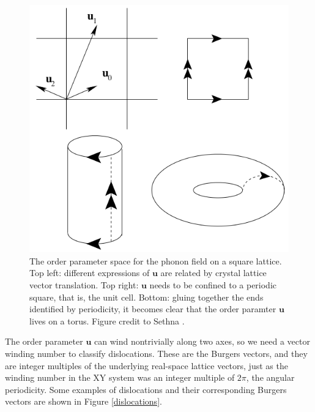 \documentclass[a4paper,10pt]{article}
\newcommand{\bv}[1]{\mathbf{#1}}
\begin{document}
\begin{figure}
 \centering
 \includegraphics[scale=0.3]{OPspacecrystal.png}
 \caption{The order parameter space for the phonon field on a square lattice. 
Top left: different expressions of $\bv u$ are related by crystal lattice 
vector translation. Top right: $\bv u$ needs to be confined to a periodic 
square, that is, the unit cell. Bottom: gluing together the ends identified by 
periodicity, it becomes clear that the order paramter $\bv u$ lives on a torus. 
Figure credit to Sethna \cite{sethna}.}
\label{OPspacecrystal}
\end{figure}

The order parameter $\bv u$ can wind 
nontrivially along two axes, so we need a vector winding number to classify 
dislocations. These are the Burgers vectors, and they are integer multiples of 
the underlying real-space lattice vectors, just as the winding number in the XY 
system was an integer multiple of $2\pi$, the angular periodicity. Some 
examples of dislocations and their corresponding Burgers vectors are shown in 
Figure \ref{dislocations}.
\end{document}
